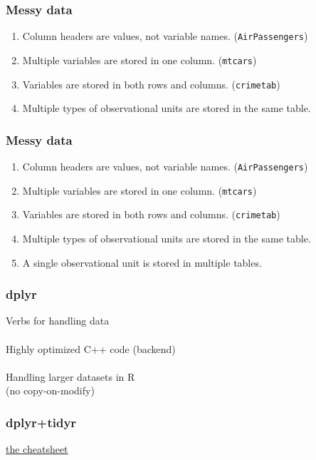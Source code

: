 \documentclass{beamer}
\begin{document}
\begin{frame}
	\frametitle{Messy data}
	\begin{center}
		\begin{enumerate}
			\item Column headers are values, not variable names. 
			(\texttt{AirPassengers})
			\item Multiple variables are stored in one column. (\texttt{mtcars})
			\item Variables are stored in both rows and columns. 
			(\texttt{crimetab})
			\item Multiple types of observational units are stored in the same 
			table.
		\end{enumerate}
	\end{center}
\end{frame}

\begin{frame}
	\frametitle{Messy data}
	\begin{center}
		\begin{enumerate}
			\item Column headers are values, not variable names. 
			(\texttt{AirPassengers})
			\item Multiple variables are stored in one column. (\texttt{mtcars})
			\item Variables are stored in both rows and columns. 
			(\texttt{crimetab})
			\item Multiple types of observational units are stored in the same 
			table.
			\item A single observational unit is stored in multiple tables.
		\end{enumerate}
	\end{center}
\end{frame}

\begin{frame}
	\frametitle{dplyr}
	\begin{center}
		\begin{enumerate}
			Verbs for handling data\\~\\
			Highly optimized C++ code (backend)\\~\\
			Handling larger datasets in R\\
			(no copy-on-modify)
		\end{enumerate}
	\end{center}
\end{frame}

\begin{frame}
	\frametitle{dplyr+tidyr}
	\begin{center}
		\href{https://www.rstudio.com/wp-content/uploads/2015/02/data-wrangling-cheatsheet.pdf}
			{the cheatsheet}
	\end{center}
\end{frame}
\end{document}
